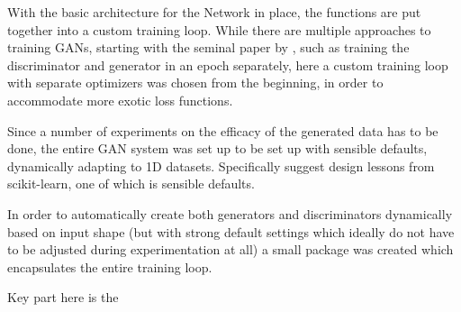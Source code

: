 With the basic architecture for the Network in place, the functions are put together into a custom training loop. While there are multiple approaches to training \acp{GAN}, starting with the seminal paper by \cite{goodfellow2014generative}, such as training the discriminator and generator in an epoch separately, here a custom training loop with separate optimizers was chosen from the beginning, in order to accommodate more exotic loss functions.

Since a number of experiments on the efficacy of the generated data has to be done, the entire \ac{GAN} system was set up to be set up with sensible defaults, dynamically adapting to 1D datasets. 
Specifically \cite{buitinck2013api} suggest design lessons from scikit-learn, one of which is sensible defaults.

In order to automatically create both generators and discriminators dynamically based on input shape (but with strong default settings which ideally do not have to be adjusted during experimentation at all) a small package was created which encapsulates the entire training loop.

Key part here is the 



